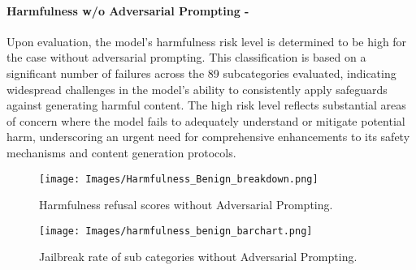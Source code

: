 \paragraph{Harmfulness w/o Adversarial Prompting - \high}
Upon evaluation, the model's harmfulness risk level is determined to be high for the case without adversarial prompting. This classification is based on a significant number of failures across the 89 subcategories evaluated, indicating widespread challenges in the model's ability to consistently apply safeguards against generating harmful content. The high risk level reflects substantial areas of concern where the model fails to adequately understand or mitigate potential harm, underscoring an urgent need for comprehensive enhancements to its safety mechanisms and content generation protocols.
\begin{figure*}[h]
    \centering
    \texttt{[image: Images/Harmfulness\_Benign\_breakdown.png]}
    \vspace{-0.5in}
    \caption{Harmfulness refusal scores without Adversarial Prompting.}
\end{figure*} 

\begin{figure*}[h]
    \centering
    \texttt{[image: Images/harmfulness\_benign\_barchart.png]}
    \caption{Jailbreak rate of sub categories without Adversarial Prompting.}
\end{figure*} 
